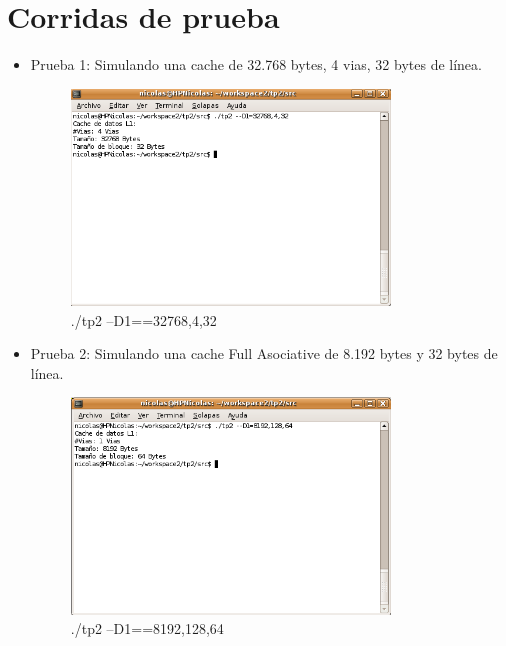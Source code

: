 \documentclass[a4paper,10pt]{article}
\begin{document}
\section{Corridas de prueba}
\begin{itemize}
	\item Prueba 1: Simulando una cache de 32.768 bytes, 4 vias, 32 bytes de l\'inea.
	\begin{figure}[h]
	\centering
	\includegraphics[width=0.8\textwidth]{Prueba1.png}
	\caption{./tp2 --D1==32768,4,32}
	\end{figure}

	\item Prueba 2: Simulando una cache Full Asociative de 8.192 bytes y 32 bytes de l\'inea.
	\begin{figure}[h]
	\centering
	\includegraphics[width=0.8\textwidth]{Prueba2.png}
	\caption{./tp2 --D1==8192,128,64}
	\end{figure}
\end{itemize}
\end{document}
